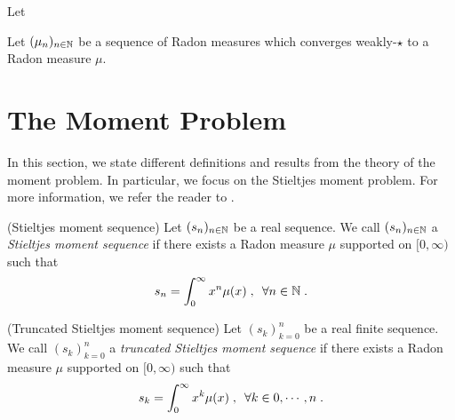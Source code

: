 \documentclass[11pt]{amsart}
\begin{document}
\begin{definition}
Let $ $
\end{definition}

\begin{proposition}
    Let $(\mu_n)_{n \in \mathbb{N}}$ be a sequence of Radon measures which converges weakly-$\star$ to a Radon measure $\mu$. 
\end{proposition}
    
\section{The Moment Problem}

In this section, we state different definitions and results from the theory of the moment problem. In particular, we focus on the Stieltjes moment problem. For more information, we refer the reader to \cite{schmudgen2017moment}.

\begin{definition}(Stieltjes moment sequence)
Let $(s_n)_{n \in \mathbb{N}}$ be a real sequence. We call $(s_n)_{n \in \mathbb{N}}$ a \emph{Stieltjes moment sequence} if there exists a Radon measure $\mu$ supported on $[0, \infty)$ such that
    \begin{equation*}
        s_n = \int_0^\infty x^n \mathrm \mu(x)
        \; , \enspace
        \forall n \in \mathbb{N}
        \; .
    \end{equation*}
\end{definition}

\begin{definition}(Truncated Stieltjes moment sequence)
Let $(s_k)_{k = 0}^n$ be a real finite sequence. We call $(s_k)_{k = 0}^n$ a \emph{truncated Stieltjes moment sequence} if there exists a Radon measure $\mu$ supported on $[0, \infty)$ such that
    \begin{equation*}
        s_k = \int_0^\infty x^k \mathrm \mu(x)
        \; , \enspace
        \forall k \in 0, \cdots, n
        \; .
    \end{equation*}
\end{definition}
\end{document}
